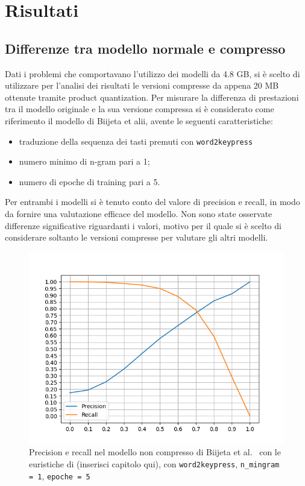 \chapter{Risultati}
\label{ch:risultati}
\section{Differenze tra modello normale e compresso}
\label{sec:differenze modello normale e compresso}
Dati i problemi che comportavano l'utilizzo dei modelli da 4.8 GB, si è scelto di utilizzare per l'analisi dei risultati le versioni compresse da appena 20 MB ottenute tramite product quantization.
Per misurare la differenza di prestazioni tra il modello originale e la sua versione compressa si è considerato come riferimento il modello di Biijeta et alii, avente le seguenti caratteristiche:
\begin{itemize}
    \item traduzione della sequenza dei tasti premuti con \texttt{word2keypress}
    \item numero minimo di n-gram pari a 1;
    \item numero di epoche di training pari a 5.
\end{itemize}
Per entrambi i modelli si è tenuto conto del valore di precision e recall, in modo da fornire una valutazione efficace del modello.
Non sono state osservate differenze significative riguardanti i valori, motivo per il quale si è scelto di considerare soltanto le versioni compresse per valutare gli altri modelli.

\begin{figure}[H]
    \centering
    \includegraphics[width=11.5cm]{./immagini/big_model.png}
    \caption{Precision e recall nel modello non compresso di Biijeta et al.~\cite{biijeta} con le euristiche di (inserisci capitolo qui), con \texttt{word2keypress}, \texttt{n\_mingram = 1}, \texttt{epoche = 5}}
    \label{bigmodel}
\end{figure}

